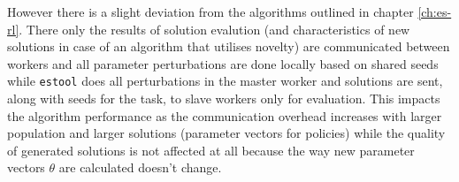However there is a slight deviation from the algorithms outlined in chapter \ref{ch:es-rl}. There only the results of solution evalution (and characteristics of new solutions in case of an algorithm that utilises novelty) are communicated between workers and all parameter perturbations are done locally based on shared seeds while \texttt{estool} does all perturbations in the master worker and solutions are sent, along with seeds for the task, to slave workers only for evaluation. This impacts the algorithm performance as the communication overhead increases with larger population and larger solutions (parameter vectors for policies) while the quality of generated solutions is not affected at all because the way new parameter vectors $\theta$ are calculated doesn't change.

